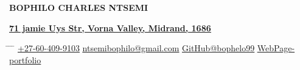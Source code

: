 \documentclass[12pt]{article}
\begin{document}
\begin{center}\textbf{\fontsize{24.7871}{1}\selectfont\color{color_29791}BOPHILO CHARLES NTSEMI}\end{center} \vspace{-8mm}
\begin{center}\textbf{\fontsize{12}{1}\selectfont\color{color_29791}\href{https://maps.app.goo.gl/37mATUypvoUqSagP9}{\underline{71 jamie Uys Str, Vorna Valley, Midrand, 1686}}}\end{center} \vspace{-8mm}
\begin{center}\begin{tabbing}
\hspace{1.8in} \= \hspace{2.5in} \= \hspace{2in} \= \kill
\textbf{\phone} \href{tel:+27-60-409-9103}{\underline{+27-60-409-9103}} \> \textbf{\faEnvelope} \href{mailto:ntsemibophilo@gmail.com}{\underline{ntsemibophilo@gmail.com}} \> \textbf{\faGithub} \href{https://github.com/bophelo99}{\underline{GitHub@bophelo99}} \> \textbf{\faGithubAlt} \href{https://bophelo99.github.io}{\underline{WebPage-portfolio}}\\
\end{tabbing}\end{center} \vspace{-5mm}
\end{document}
